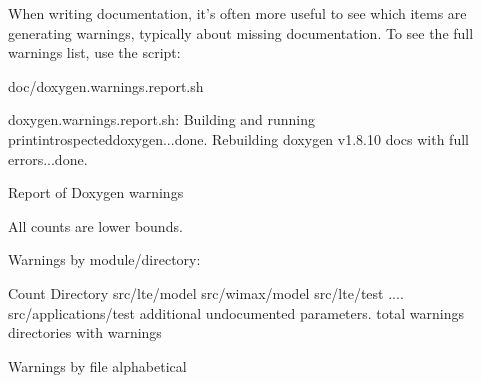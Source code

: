 \documentclass[letterpaper,10pt,english]{sphinxmanual}
\renewcommand{\sphinxcode}[1]{\texttt{\small{#1}}}
\begin{document}
When writing documentation, it’s often more useful to see which items
are generating warnings, typically about missing documentation.  To
see the full warnings list, use the \sphinxcode{}
script:

\begin{sphinxVerbatim}[commandchars=\\\{\}]
\PYGZdl{} doc/doxygen.warnings.report.sh

doxygen.warnings.report.sh:
Building and running print\PYGZhy{}introspected\PYGZhy{}doxygen...done.
Rebuilding doxygen v1.8.10 docs with full errors...done.


Report of Doxygen warnings
\PYGZhy{}\PYGZhy{}\PYGZhy{}\PYGZhy{}\PYGZhy{}\PYGZhy{}\PYGZhy{}\PYGZhy{}\PYGZhy{}\PYGZhy{}\PYGZhy{}\PYGZhy{}\PYGZhy{}\PYGZhy{}\PYGZhy{}\PYGZhy{}\PYGZhy{}\PYGZhy{}\PYGZhy{}\PYGZhy{}\PYGZhy{}\PYGZhy{}\PYGZhy{}\PYGZhy{}\PYGZhy{}\PYGZhy{}\PYGZhy{}\PYGZhy{}\PYGZhy{}\PYGZhy{}\PYGZhy{}\PYGZhy{}\PYGZhy{}\PYGZhy{}\PYGZhy{}\PYGZhy{}\PYGZhy{}\PYGZhy{}\PYGZhy{}\PYGZhy{}

All counts are lower bounds.

Warnings by module/directory:

Count Directory
\PYGZhy{}\PYGZhy{}\PYGZhy{}\PYGZhy{}\PYGZhy{} \PYGZhy{}\PYGZhy{}\PYGZhy{}\PYGZhy{}\PYGZhy{}\PYGZhy{}\PYGZhy{}\PYGZhy{}\PYGZhy{}\PYGZhy{}\PYGZhy{}\PYGZhy{}\PYGZhy{}\PYGZhy{}\PYGZhy{}\PYGZhy{}\PYGZhy{}\PYGZhy{}\PYGZhy{}\PYGZhy{}\PYGZhy{}\PYGZhy{}\PYGZhy{}\PYGZhy{}\PYGZhy{}\PYGZhy{}\PYGZhy{}\PYGZhy{}\PYGZhy{}\PYGZhy{}\PYGZhy{}\PYGZhy{}\PYGZhy{}\PYGZhy{}
 src/lte/model
 src/wimax/model
  src/lte/test
....
    src/applications/test
  additional undocumented parameters.
\PYGZhy{}\PYGZhy{}\PYGZhy{}\PYGZhy{}\PYGZhy{}\PYGZhy{}\PYGZhy{}\PYGZhy{}\PYGZhy{}\PYGZhy{}\PYGZhy{}\PYGZhy{}\PYGZhy{}\PYGZhy{}\PYGZhy{}\PYGZhy{}\PYGZhy{}\PYGZhy{}\PYGZhy{}\PYGZhy{}\PYGZhy{}\PYGZhy{}\PYGZhy{}\PYGZhy{}\PYGZhy{}\PYGZhy{}\PYGZhy{}\PYGZhy{}\PYGZhy{}\PYGZhy{}\PYGZhy{}\PYGZhy{}\PYGZhy{}\PYGZhy{}\PYGZhy{}\PYGZhy{}\PYGZhy{}\PYGZhy{}\PYGZhy{}\PYGZhy{}
  total warnings
    directories with warnings


Warnings by file alphabetical


\end{sphinxVerbatim}
\end{document}

